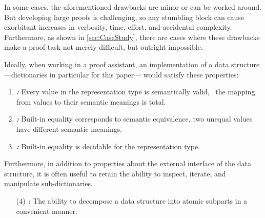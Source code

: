 In some cases, the aforementioned drawbacks are minor or can be worked around.
%
But developing large proofs is challenging, so any stumbling block can cause exorbitant increases in verbosity, time, effort, and accidental complexity.
%
Furthermore, as shown in \autoref{sec:CaseStudy}, there are cases where these drawbacks make a proof task not merely difficult, but outright impossible.


Ideally, when working in a proof assistant, an implementation of a data structure ---dictionaries in particular for this paper--- would satisfy these properties:

\newcommand{\designGoal}[1]
  {\textbf{\emph{#1:}}}

\begin{enumerate}

\item
%
\designGoal{\SemTot}
%
Every value in the representation type is semantically valid, \ie{}~the mapping from values to their semantic meanings is total.

\item
%
\designGoal{\SemInj}
%
Built-in equality corresponds to semantic equivalence, \ie{} two unequal values have different semantic meanings.

\item
%
\designGoal{\EqDec}
%
Built-in equality is decidable for the representation type.

\end{enumerate}

Furthermore, in addition to properties about the external interface of the data structure, it is often useful to retain the ability to inspect, iterate, and manipulate sub-dictionaries.
%

\begin{enumerate}

\item[(4)]
%
\designGoal{\EzDstr}
%
The ability to decompose a data structure into atomic subparts in a convenient manner.



\end{enumerate}



